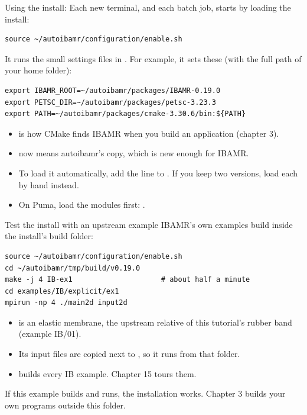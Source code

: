 \documentclass[aspectratio=169,11pt]{beamer}
\begin{document}
\begin{frame}[fragile]{Using the install: }
Each new terminal, and each batch job, starts by loading the install:
\begin{lstlisting}[style=shell]
source ~/autoibamr/configuration/enable.sh
\end{lstlisting}
It runs the small settings files in . For example, it sets these (with the full path of your home folder):
\begin{lstlisting}[style=shell]
export IBAMR_ROOT=~/autoibamr/packages/IBAMR-0.19.0
export PETSC_DIR=~/autoibamr/packages/petsc-3.23.3
export PATH=~/autoibamr/packages/cmake-3.30.6/bin:${PATH}
\end{lstlisting}
\begin{itemize}\small
  \item {} is how CMake finds IBAMR when you build an application (chapter 3).
  \item {} now means autoibamr's copy, which is new enough for IBAMR.
  \item To load it automatically, add the  line to . If you keep two versions, load each by hand instead.
  \item On Puma, load the modules first: .
\end{itemize}
\end{frame}

\begin{frame}[fragile]{Test the install with an upstream example}
IBAMR's own examples build inside the install's build folder:
\begin{lstlisting}[style=shell]
source ~/autoibamr/configuration/enable.sh
cd ~/autoibamr/tmp/build/v0.19.0
make -j 4 IB-ex1                     # about half a minute
cd examples/IB/explicit/ex1
mpirun -np 4 ./main2d input2d
\end{lstlisting}
\begin{itemize}\small
  \item {} is an elastic membrane, the upstream relative of this tutorial's rubber band (example IB/01).
  \item Its input files are copied next to , so it runs from that folder.
  \item {} builds every IB example. Chapter 15 tours them.
\end{itemize}
\begin{punchbox}
\small If this example builds and runs, the installation works. Chapter 3 builds your own programs outside this folder.
\end{punchbox}
\end{frame}
\end{document}
